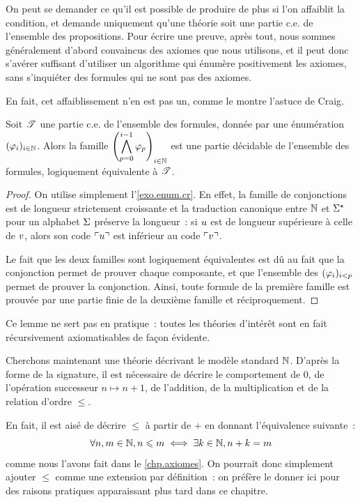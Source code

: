 On peut se demander ce qu'il est possible de produire de plus si l'on affaiblit
la condition, et demande uniquement qu'une théorie soit une partie c.e. de
l'ensemble des propositions. Pour écrire une preuve, après tout, nous sommes
généralement d'abord convaincus des axiomes que nous utilisons, et il
peut donc s'avérer suffisant d'utiliser un algorithme qui énumère positivement
les axiomes, sans s'inquiéter des formules qui ne sont pas des axiomes.

En fait, cet affaiblissement n'en est pas un, comme le montre l'astuce de Craig.

\begin{lemma}
  Soit $\mathscr T$ une partie c.e. de l'ensemble des formules, donnée
  par une énumération $(\varphi_i)_{i \in \mathbb N}$. Alors la famille
  $\displaystyle\left(\bigwedge_{p=0}^{i-1} \varphi_p\right)_{i \in \mathbb N}$
  est une partie décidable de l'ensemble des formules, logiquement équivalente à
  $\mathscr T$.
\end{lemma}

\begin{proof}
  On utilise simplement l'\cref{exo.enum.cr}. En effet, la famille de
  conjonctions est de longueur strictement croissante et la traduction canonique
  entre $\mathbb N$ et $\Sigma^{\star}$ pour un alphabet $\Sigma$ préserve la longueur~:
  si $u$ est de longueur supérieure à celle de $v$, alors son code
  $\ulcorner u\urcorner$ est inférieur au code $\ulcorner v\urcorner$.

  Le fait que les deux familles sont logiquement équivalentes est dû au fait
  que la conjonction permet de prouver chaque composante, et que l'ensemble
  des $(\varphi_i)_{i < p}$ permet de prouver la 
  conjonction. Ainsi, toute formule de la première famille est prouvée par une
  partie finie de la deuxième famille et réciproquement.
\end{proof}

Ce lemme ne sert pas en pratique~: toutes les théories d'intérêt sont en fait
récursivement axiomatisables de façon évidente.

Cherchons maintenant une théorie décrivant le modèle standard $\mathbb N$. D'après la
forme de la signature, il est nécessaire de décrire le comportement de $0$, de
l'opération successeur $n \mapsto n+1$, de l'addition, de la multiplication et
de la relation d'ordre $\leq$.

En fait, il est aisé de décrire $\leq$ à partir de $+$ en donnant l'équivalence
suivante~:
\[\forall n,m \in \mathbb N, n \leqslant m \iff \exists k \in \mathbb N, n + k = m\]
comme nous l'avons fait dans le \cref{chp.axiomes}. On pourrait donc simplement
ajouter $\leq$ comme une extension par définition~: on préfère le donner ici
pour des raisons pratiques apparaissant plus tard dans ce chapitre.

